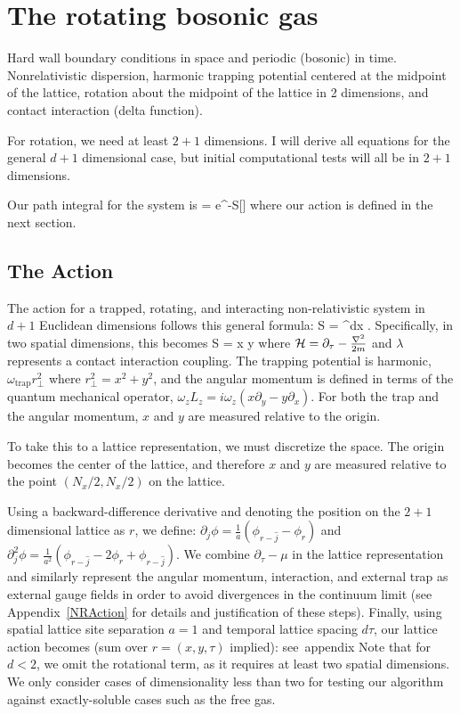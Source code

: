 \documentclass[../../RotatingBosons.tex]{subfiles}
\begin{document}
\section{The rotating bosonic gas}
Hard wall boundary conditions in space and periodic (bosonic) in time. Nonrelativistic dispersion, harmonic trapping potential centered at the midpoint of the lattice, rotation about the midpoint of the lattice in 2 dimensions, and contact interaction (delta function).

For rotation, we need at least $2+1$ dimensions. I will derive all equations for the general $d+1$ dimensional case, but initial computational tests will all be in $2+1$ dimensions.

Our path integral for the system is 
%
\beq
\CZ = \int \dif \phi e^{-S[\phi]}
\eeq
%
where our action is defined in the next section.
\subsection{The Action}
The action for a trapped, rotating, and interacting non-relativistic system in $d+1$ Euclidean dimensions follows this general formula:
%
\beq
S = \int \dif^{d}x \dif\tau {}.
\eeq 
%
Specifically, in two spatial dimensions, this becomes
%
\beq
S = \int \dif x \dif y \dif \tau {}
\eeq 
%
where ${\mathcal H} = \partial_{\tau} - \frac{{\nabla}^{2}}{2m} $ and $\lambda$ represents a contact interaction coupling. The trapping potential is harmonic, $\omega_{\text{trap}}r_{\perp}^{2}$ where $r_{\perp}^{2} = x^{2} + y^{2}$, and the angular momentum is defined in terms of the quantum mechanical operator, $\omega_{z}L_{z} = i \omega_{z}(x \partial_{y} - y\partial_{x})$. For both the trap and the angular momentum, $x$ and $y$ are measured relative to the origin.

To take this to a lattice representation, we must discretize the space. The origin becomes the center of the lattice, and therefore $x$ and $y$ are measured relative to the point $(N_{x}/2, N_{x}/2)$ on the lattice.

Using a backward-difference derivative and denoting the position on the $2+1$ dimensional lattice as $r$, we define: $\partial_{j}\phi = \frac{1}{a}(\phi_{r-\hat{j}} - \phi_{r})$ and $\partial_{j}^{2}\phi = \frac{1}{a^{2}}(\phi_{r-\hat{j}} - 2\phi_{r}+\phi_{r-\hat{j}})$. We combine $\partial_{\tau} - \mu$ in the lattice representation and similarly represent the angular momentum, interaction, and external trap as external gauge fields in order to avoid divergences in the continuum limit (see Appendix~\ref{NRAction} for details and justification of these steps). Finally, using spatial lattice site separation $a = 1$ and temporal lattice spacing $d\tau$, our lattice action becomes (sum over $r = (x,y,\tau)$ implied):
%
\bea
see\ appendix
\eea 
%
Note that for $d < 2$, we omit the rotational term, as it requires at least two spatial dimensions. We only consider cases of dimensionality less than two for testing our algorithm against exactly-soluble cases such as the free gas.
\end{document}
